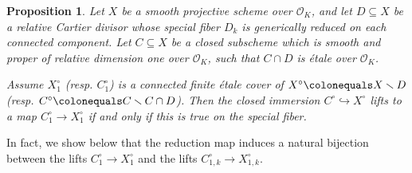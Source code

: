 \documentclass[11pt, letterpaper]{amsart}
\theoremstyle{plain}
\newtheorem{proposition}[theorem]{Proposition}
\theoremstyle{definition}
\newcommand{\<}{\langle}
\renewcommand{\>}{\rangle}
\newcommand{\into}{\hookrightarrow}
\newcommand{\sO}{\mathcal{O}}
\begin{document}
\begin{proposition}
	\label{prop:lift_closed_immersion}
	Let $X$ be a smooth projective scheme over $\sO_K$, and let $D \subseteq X$ be a relative Cartier divisor whose special fiber $D_k$ is generically reduced on each connected component. 
	Let $C \subseteq X$ be a closed subscheme which is smooth and proper of relative dimension one over $\sO_K$, such that $C \cap D$ is \'etale over $\sO_K$. 
	
	Assume $X_1^\circ$ (resp. $C_1^\circ$) is a connected finite \'etale cover of $X^\circ \colonequals X \smallsetminus D$ (resp. $C^\circ \colonequals C \smallsetminus C \cap D$). 
	Then the closed immersion $C^\circ \into X^\circ$ lifts to a map $C_1^\circ \to X_1^\circ$ if and only if this is true on the special fiber.  
\end{proposition}
In fact, we show below that the reduction map induces a natural bijection between the lifts $C_1^\circ \to X_1^\circ$ and the lifts $C_{1,k}^\circ \to X_{1, k}^\circ$.
\end{document}
